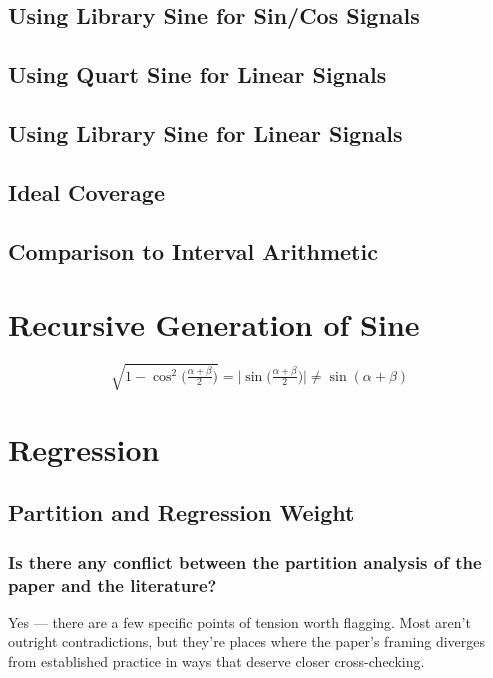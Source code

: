 \documentclass[twoside]{article}
\numberwithin{equation}{section}
\begin{document}
\subsection{Using Library Sine for Sin/Cos Signals}

\subsection{Using Quart Sine for Linear Signals}

\subsection{Using Library Sine for Linear Signals}

\subsection{Ideal Coverage}

\subsection{Comparison to Interval Arithmetic}

\section{Recursive Generation of Sine}

$$\sqrt{1 - \cos^2\big(\tfrac{\alpha+\beta}{2}\big)} = \big|\sin\big(\tfrac{\alpha+\beta}{2}\big)\big| \neq \sin(\alpha + \beta)$$

\section{Regression}

\subsection{Partition and Regression Weight}

\subsubsection{Is there any conflict between the partition analysis of the paper and the literature?}

Yes — there are a few specific points of tension worth flagging. Most aren't outright contradictions, but they're places where the paper's framing diverges from established practice in ways that deserve closer cross-checking.
\end{document}
